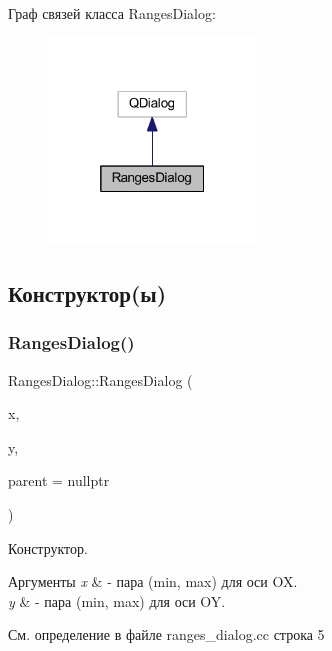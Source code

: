 Граф связей класса Ranges\+Dialog\+:
\nopagebreak
\begin{figure}[H]
\begin{center}
\leavevmode
\includegraphics[width=157pt]{class_ranges_dialog__coll__graph}
\end{center}
\end{figure}


\subsection{Конструктор(ы)}
\hypertarget{class_ranges_dialog_a029bf2335408c07771d67c5875433214}{}\label{class_ranges_dialog_a029bf2335408c07771d67c5875433214} 
\subsubsection{\texorpdfstring{Ranges\+Dialog()}{RangesDialog()}}
{\footnotesize\ttfamily Ranges\+Dialog\+::\+Ranges\+Dialog (\begin{DoxyParamCaption}\item[{const Math\+::\+Vector2 \&}]{x,  }\item[{const Math\+::\+Vector2 \&}]{y,  }\item[{Q\+Widget $\ast$}]{parent = {\ttfamily nullptr} }\end{DoxyParamCaption})}



Конструктор. 


\begin{DoxyParams}{Аргументы}
{\em x} & -\/ пара (min, max) для оси OX. \\
\hline
{\em y} & -\/ пара (min, max) для оси OY. \\
\hline
\end{DoxyParams}


См. определение в файле ranges\+\_\+dialog.\+cc строка 5



